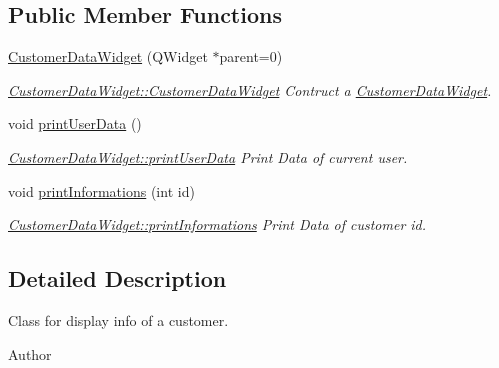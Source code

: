 \subsection*{Public Member Functions}
\begin{DoxyCompactItemize}
\item 
\hyperlink{classGui_1_1Widgets_1_1CustomerDataWidget_a649d25216952fa8642b22983a07c9186}{Customer\-Data\-Widget} (Q\-Widget $\ast$parent=0)
\begin{DoxyCompactList}\small\item\em \hyperlink{classGui_1_1Widgets_1_1CustomerDataWidget_a649d25216952fa8642b22983a07c9186}{Customer\-Data\-Widget\-::\-Customer\-Data\-Widget} Contruct a \hyperlink{classGui_1_1Widgets_1_1CustomerDataWidget}{Customer\-Data\-Widget}. \end{DoxyCompactList}\item 
\hypertarget{classGui_1_1Widgets_1_1CustomerDataWidget_a78504b749fc7d80302c27748a4033b1f}{void \hyperlink{classGui_1_1Widgets_1_1CustomerDataWidget_a78504b749fc7d80302c27748a4033b1f}{print\-User\-Data} ()}\label{classGui_1_1Widgets_1_1CustomerDataWidget_a78504b749fc7d80302c27748a4033b1f}

\begin{DoxyCompactList}\small\item\em \hyperlink{classGui_1_1Widgets_1_1CustomerDataWidget_a78504b749fc7d80302c27748a4033b1f}{Customer\-Data\-Widget\-::print\-User\-Data} Print Data of current user. \end{DoxyCompactList}\item 
void \hyperlink{classGui_1_1Widgets_1_1CustomerDataWidget_aa995ed95c5ca119db4258af2fe403691}{print\-Informations} (int id)
\begin{DoxyCompactList}\small\item\em \hyperlink{classGui_1_1Widgets_1_1CustomerDataWidget_aa995ed95c5ca119db4258af2fe403691}{Customer\-Data\-Widget\-::print\-Informations} Print Data of customer id. \end{DoxyCompactList}\end{DoxyCompactItemize}


\subsection{Detailed Description}
Class for display info of a customer. 

\begin{DoxyAuthor}{Author}

\end{DoxyAuthor}


